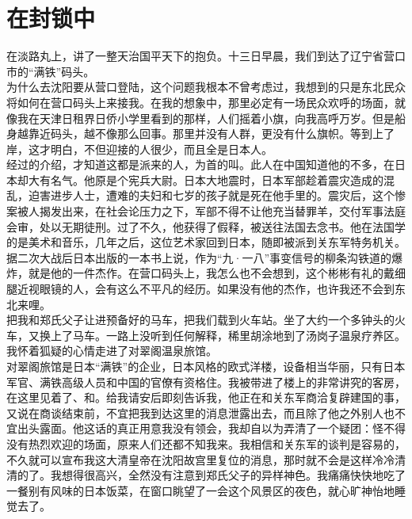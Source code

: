 \fancyhead[RO]{} %
\fancyhead[LE]{} %
\chapter*{在封锁中}
\thispagestyle{empty}
在淡路丸上，讲了一整天治国平天下的抱负。十三日早晨，我们到达了辽宁省营口市的“满铁”码头。\\

为什么去沈阳要从营口登陆，这个问题我根本不曾考虑过，我想到的只是东北民众将如何在营口码头上来接我。在我的想象中，那里必定有一场民众欢呼的场面，就像我在天津日租界日侨小学里看到的那样，人们摇着小旗，向我高呼万岁。但是船身越靠近码头，越不像那么回事。那里并没有人群，更没有什么旗帜。等到上了岸，这才明白，不但迎接的人很少，而且全是日本人。\\

经过的介绍，才知道这都是派来的人，为首的叫。此人在中国知道他的不多，在日本却大有名气。他原是个宪兵大尉。日本大地震时，日本军部趁着震灾造成的混乱，迫害进步人士，遭难的夫妇和七岁的孩子就是死在他手里的。震灾后，这个惨案被人揭发出来，在社会论压力之下，军部不得不让他充当替罪羊，交付军事法庭会审，处以无期徒刑。过了不久，他获得了假释，被送往法国去念书。他在法国学的是美术和音乐，几年之后，这位艺术家回到日本，随即被派到关东军特务机关。据二次大战后日本出版的一本书上说，作为“九·一八”事变信号的柳条沟铁道的爆炸，就是他的一件杰作。在营口码头上，我怎么也不会想到，这个彬彬有礼的戴细腿近视眼镜的人，会有这么不平凡的经历。如果没有他的杰作，也许我还不会到东北来哩。\\

把我和郑氏父子让进预备好的马车，把我们载到火车站。坐了大约一个多钟头的火车，又换上了马车。一路上没听到任何解释，稀里胡涂地到了汤岗子温泉疗养区。我怀着狐疑的心情走进了对翠阁温泉旅馆。\\

对翠阁旅馆是日本“满铁”的企业，日本风格的欧式洋楼，设备相当华丽，只有日本军官、满铁高级人员和中国的官僚有资格住。我被带进了楼上的非常讲究的客房，在这里见着了、和。给我请安后即刻告诉我，他正在和关东军商洽复辟建国的事，又说在商谈结束前，不宜把我到达这里的消息泄露出去，而且除了他之外别人也不宜出头露面。他这话的真正用意我没有领会，我却自以为弄清了一个疑团：怪不得没有热烈欢迎的场面，原来人们还都不知我来。我相信和关东军的谈判是容易的，不久就可以宣布我这大清皇帝在沈阳故宫里复位的消息，那时就不会是这样冷冷清清的了。我想得很高兴，全然没有注意到郑氏父子的异样神色。我痛痛快快地吃了一餐别有风味的日本饭菜，在窗口眺望了一会这个风景区的夜色，就心旷神怡地睡觉去了。\\

